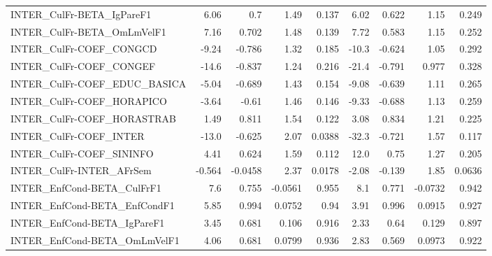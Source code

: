 \begin{tabular}{lrrrrrrrr}
INTER\_CulFr-BETA\_IgPareF1             &        6.06 &          0.7 &    1.49 &    0.137 &       6.02 &       0.622 &         1.15 &         0.249 \\
INTER\_CulFr-BETA\_OmLmVelF1            &        7.16 &        0.702 &    1.48 &    0.139 &       7.72 &       0.583 &         1.15 &         0.252 \\
INTER\_CulFr-COEF\_CONGCD               &       -9.24 &       -0.786 &    1.32 &    0.185 &      -10.3 &      -0.624 &         1.05 &         0.292 \\
INTER\_CulFr-COEF\_CONGEF               &       -14.6 &       -0.837 &    1.24 &    0.216 &      -21.4 &      -0.791 &        0.977 &         0.328 \\
INTER\_CulFr-COEF\_EDUC\_BASICA          &       -5.04 &       -0.689 &    1.43 &    0.154 &      -9.08 &      -0.639 &         1.11 &         0.265 \\
INTER\_CulFr-COEF\_HORAPICO             &       -3.64 &        -0.61 &    1.46 &    0.146 &      -9.33 &      -0.688 &         1.13 &         0.259 \\
INTER\_CulFr-COEF\_HORASTRAB            &        1.49 &        0.811 &    1.54 &    0.122 &       3.08 &       0.834 &         1.21 &         0.225 \\
INTER\_CulFr-COEF\_INTER                &       -13.0 &       -0.625 &    2.07 &   0.0388 &      -32.3 &      -0.721 &         1.57 &         0.117 \\
INTER\_CulFr-COEF\_SININFO              &        4.41 &        0.624 &    1.59 &    0.112 &       12.0 &        0.75 &         1.27 &         0.205 \\
INTER\_CulFr-INTER\_AFrSem              &      -0.564 &      -0.0458 &    2.37 &   0.0178 &      -2.08 &      -0.139 &         1.85 &        0.0636 \\
INTER\_EnfCond-BETA\_CulFrF1            &         7.6 &        0.755 & -0.0561 &    0.955 &        8.1 &       0.771 &      -0.0732 &         0.942 \\
INTER\_EnfCond-BETA\_EnfCondF1          &        5.85 &        0.994 &  0.0752 &     0.94 &       3.91 &       0.996 &       0.0915 &         0.927 \\
INTER\_EnfCond-BETA\_IgPareF1           &        3.45 &        0.681 &   0.106 &    0.916 &       2.33 &        0.64 &        0.129 &         0.897 \\
INTER\_EnfCond-BETA\_OmLmVelF1          &        4.06 &        0.681 &  0.0799 &    0.936 &       2.83 &       0.569 &       0.0973 &         0.922 \\

\end{tabular}

